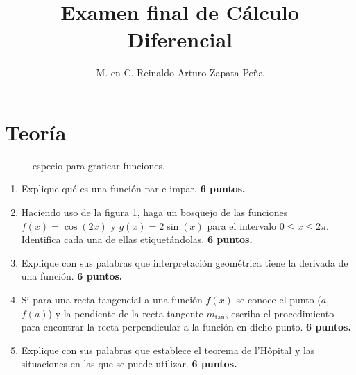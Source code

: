 \documentclass{article}
\title{Examen final de Cálculo Diferencial}
\author{M. en C. Reinaldo Arturo Zapata Peña}
\begin{document}


\section{Teoría} %
\label{sec:teoria}


\begin{figure}[b]
    \centering
    \caption{especio  para graficar funciones.}
    \label{fig:graficar}
\end{figure}
\begin{enumerate}
\item Explique qué es una función par e impar.
\hfill \textbf{6 puntos.}

\item Haciendo uso de la figura \ref{fig:graficar}, haga un bosquejo de las
funciones $f(x)=\cos(2x)$ y $g(x)=2\sin(x)$ para el intervalo $0 \leq x \leq
2\pi$. Identifica cada una de ellas etiquet\'andolas.
\hfill \textbf{6 puntos.}

\item Explique con sus palabras que interpretación geométrica tiene la
derivada de una función.
\hfill \textbf{6 puntos.}

\item Si para una recta tangencial a una función $f(x)$ se conoce el punto
($a$,$f(a)$) y la pendiente de la recta tangente $m_{\text{tan}}$, escriba el
procedimiento para encontrar la recta perpendicular a la función en dicho punto.
\hfill \textbf{6 puntos.}

\item Explique con sus palabras que establece el teorema de l'H\^opital y las
situaciones en las que se puede utilizar.
\hfill \textbf{6 puntos.}

\end{enumerate}
\end{document}
